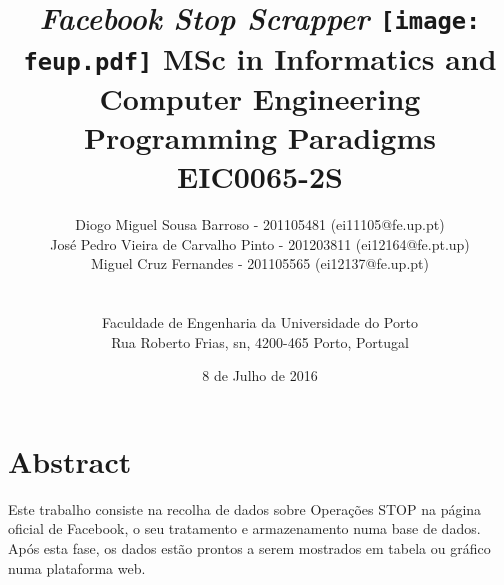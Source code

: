\documentclass[12pt]{article}
\begin{document}
\setlength{\textwidth}{16cm}
\setlength{\textheight}{22cm}
\title{\huge{\textbf{\textit{Facebook Stop Scrapper}}}\linebreak
\linebreak\linebreak\linebreak
\texttt{[image: feup.pdf]}\linebreak \linebreak
\large{MSc in Informatics and Computer Engineering} \linebreak
\large{Programming Paradigms \\ EIC0065-2S}\linebreak
}
\author{
Diogo Miguel Sousa Barroso - 201105481 (ei11105@fe.up.pt)\\
José Pedro Vieira de Carvalho Pinto - 201203811 (ei12164@fe.pt.up)\\
Miguel Cruz Fernandes - 201105565 (ei12137@fe.up.pt)\\
\\
\\ Faculdade de Engenharia da Universidade do Porto \\ Rua Roberto Frias, s\/n, 4200-465 Porto, Portugal
 \vspace{1cm}}
\date{8 de Julho de 2016}
\maketitle
\thispagestyle{empty}


\newpage
\section*{Abstract}
Este trabalho consiste na recolha de dados sobre Operações STOP na página oficial de Facebook, o seu tratamento e armazenamento numa base de dados. Após esta fase, os dados estão prontos a serem mostrados em tabela ou gráfico numa plataforma web.

\newpage
\tableofcontents


\end{document}
